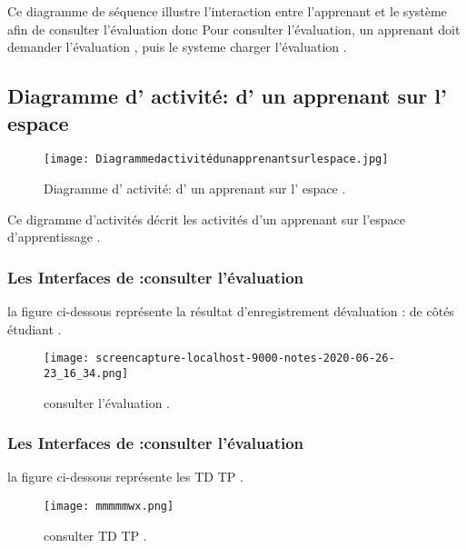 Ce diagramme de séquence illustre l'interaction entre l'apprenant et le système afin de consulter l'évaluation  donc  Pour consulter l'évaluation, un apprenant doit  demander l'évaluation , puis le systeme charger l'évaluation .



\clearpage


\subsection{Diagramme d' activité: d' un apprenant sur l' espace}


\begin{figure}[ht]
	\centering
	\texttt{[image: Diagrammedactivitédunapprenantsurlespace.jpg]}
	\caption{Diagramme d' activité: d' un apprenant sur l' espace .}
	\label{fig:Diagramme d' activité: d' un apprenant sur l' espace }
\end{figure}
\FloatBarrier

Ce digramme d’activités décrit les activités d’un apprenant  sur l'espace d'apprentissage .
\subsubsection{Les Interfaces de :consulter l'évaluation  }

la figure ci-dessous représente la résultat  d'enregistrement dévaluation : de côtés  étudiant .
\begin{figure}[ht]
	\centering
	\texttt{[image: screencapture-localhost-9000-notes-2020-06-26-23\_16\_34.png]}
	\caption{consulter l'évaluation .}
	\label{fig:consulter l'évaluation }
\end{figure}
\FloatBarrier
\subsubsection{Les Interfaces de :consulter l'évaluation  }

la figure ci-dessous représente les TD TP .
\begin{figure}[ht]
	\centering
	\texttt{[image: mmmmmwx.png]}
	\caption{consulter TD TP .}
	\label{fig:consulter TD TP }
\end{figure}
\FloatBarrier


